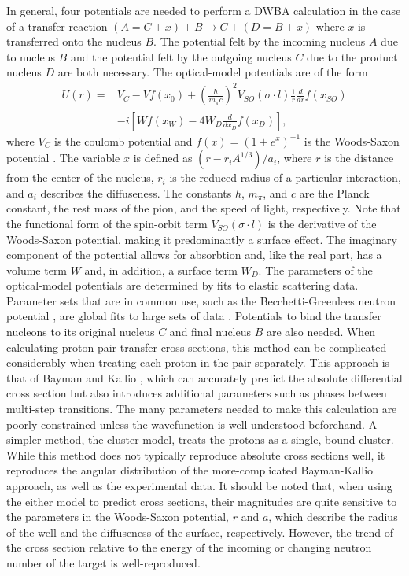In general, four potentials are needed to perform a DWBA calculation in the case of a transfer reaction $(A = C+x)+B\rightarrow C+(D = B+x)$ where $x$ is transferred onto the nucleus $B$.  The potential felt by the incoming nucleus $A$ due to nucleus $B$ and the potential felt by the outgoing nucleus $C$ due to the product nucleus $D$ are both necessary.  The optical-model potentials are of the form
\begin{equation}
\begin{split}
U(r) = & V_C - Vf(x_0) + \left( \frac{h}{m_{\pi}c} \right) ^2 V_{SO}(\sigma\cdot l)\frac{1}{r}\frac{d}{dr}f(x_{SO}) \\
 & -i[Wf(x_W) - 4W_D\frac{d}{dx_D}f(x_D)],
\end{split}
\end{equation}
where $V_C$ is the coulomb potential and $f(x)=(1+e^x)^{-1}$ is the Woods-Saxon potential \citep{PereyPerey}.  The variable $x$ is defined as $(r-r_iA^{1/3})/a_i$, where $r$ is the distance from the center of the nucleus, $r_i$ is the reduced radius of a particular interaction, and $a_i$ describes the diffuseness.  The constants $h$, $m_{\pi}$, and $c$ are the Planck constant, the rest mass of the pion, and the speed of light, respectively.  Note that the functional form of the spin-orbit term $V_{SO}(\sigma\cdot l)$ is the derivative of the Woods-Saxon potential, making it predominantly a surface effect.  The imaginary component of the potential allows for absorbtion and, like the real part, has a volume term $W$ and, in addition, a surface term $W_D$.  The parameters of the optical-model potentials are determined by fits to elastic scattering data.  Parameter sets that are in common use, such as the Becchetti-Greenlees neutron potential \citep{Becchetti_neutronPotential}, are global fits to large sets of data \citep{PereyPerey}.  Potentials to bind the transfer nucleons to its original nucleus $C$ and final nucleus $B$ are also needed. 
When calculating proton-pair transfer cross sections, this method can be complicated considerably when treating each proton in the pair separately.  This approach is that of Bayman and Kallio \citep{BaymanKallio}, which can accurately predict the absolute differential cross section but also introduces additional parameters such as phases between multi-step transitions.  The many parameters needed to make this calculation are poorly constrained unless the wavefunction is well-understood beforehand.  A simpler method, the cluster model, treats the protons as a single, bound cluster.  While this method does not typically reproduce absolute cross sections well, it reproduces the angular distribution of the more-complicated Bayman-Kallio approach, as well as the experimental data.  It should be noted that, when using the either model to predict cross sections, their magnitudes are quite sensitive to the parameters in the Woods-Saxon potential, $r$ and $a$, which describe the radius of the well and the diffuseness of the surface, respectively.  However, the trend of the cross section relative to the energy of the incoming  or changing neutron number of the target is well-reproduced.

